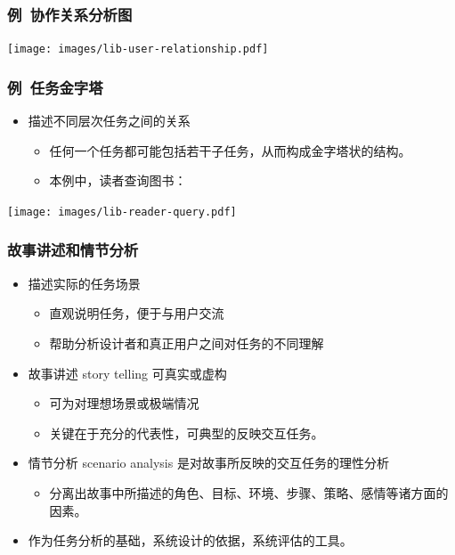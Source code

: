 \documentclass{beamer}
\begin{document}
\begin{frame}
	\frametitle{例~{\small 协作关系分析图}}
	\texttt{[image: images/lib-user-relationship.pdf]}
\end{frame}

\begin{frame}
	\frametitle{例~{\small 任务金字塔}}
	\begin{itemize}
		\item 描述不同层次任务之间的关系
		\begin{itemize}
			\item 任何一个任务都可能包括若干子任务，从而构成金字塔状的结构。
			\item 本例中，读者查询图书：
		\end{itemize}
	\end{itemize}
	\begin{center}
	\texttt{[image: images/lib-reader-query.pdf]}
	\end{center}
\end{frame}

\begin{frame}
	\frametitle{故事讲述和情节分析}
	\beamertemplatetransparentcovereddynamicmedium
	\begin{itemize}
		\item 描述实际的任务场景
		\begin{itemize}
			\item 直观说明任务，便于与用户交流
			\item 帮助分析设计者和真正用户之间对任务的不同理解
		\end{itemize}
		\pause
		\item 故事讲述 story telling 可真实或虚构
		\begin{itemize}
			\item 可为对理想场景或极端情况
			\item 关键在于充分的代表性，可典型的反映交互任务。
		\end{itemize}
		\pause
		\item 情节分析 scenario analysis 是对故事所反映的交互任务的理性分析
		\begin{itemize}
			\item 分离出故事中所描述的角色、目标、环境、步骤、策略、感情等诸方面的因素。
		\end{itemize}
		\pause
		\item 作为任务分析的基础，系统设计的依据，系统评估的工具。 %
	\end{itemize}
\end{frame}
\end{document}
